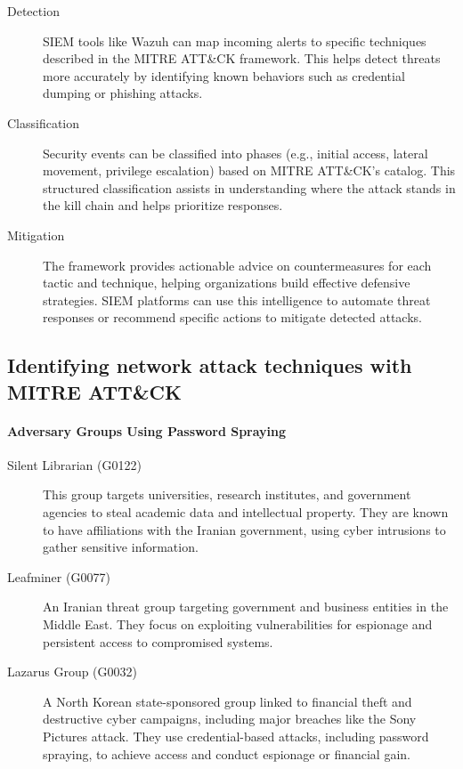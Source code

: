 \documentclass[12pt,a4paper]{report}
\begin{document}
\begin{description}
	\item[Detection] SIEM tools like Wazuh can map incoming alerts to specific techniques described in the MITRE ATT\&CK framework. This helps detect threats more accurately by identifying known behaviors such as credential dumping or phishing attacks.
	
	\item[Classification] Security events can be classified into phases (e.g., initial access, lateral movement, privilege escalation) based on MITRE ATT\&CK’s catalog. This structured classification assists in understanding where the attack stands in the kill chain and helps prioritize responses.
	
	\item[Mitigation]The framework provides actionable advice on countermeasures for each tactic and technique, helping organizations build effective defensive strategies. SIEM platforms can use this intelligence to automate threat responses or recommend specific actions to mitigate detected attacks.
	
\end{description}

\subsection{Identifying network attack techniques with MITRE ATT\&CK}

\paragraph{Adversary Groups Using Password Spraying}
\begin{description}
	\item[Silent Librarian (G0122)] This group targets universities, research institutes, and government agencies to steal academic data and intellectual property. They are known to have affiliations with the Iranian government, using cyber intrusions to gather sensitive information.
	
	\item[Leafminer (G0077)] An Iranian threat group targeting government and business entities in the Middle East. They focus on exploiting vulnerabilities for espionage and persistent access to compromised systems.
	
	\item[Lazarus Group (G0032)] A North Korean state-sponsored group linked to financial theft and destructive cyber campaigns, including major breaches like the Sony Pictures attack. They use credential-based attacks, including password spraying, to achieve access and conduct espionage or financial gain.

\end{description}
\end{document}
